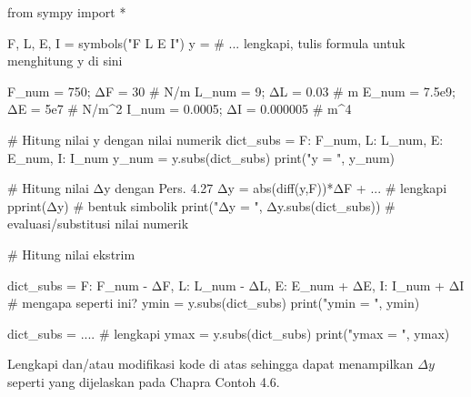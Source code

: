 \begin{pythoncode}
from sympy import *

F, L, E, I = symbols("F L E I")
y = # ... lengkapi, tulis formula untuk menghitung y di sini
    
F_num = 750; ΔF = 30 # N/m
L_num = 9; ΔL = 0.03 # m
E_num = 7.5e9; ΔE = 5e7 # N/m^2
I_num = 0.0005; ΔI = 0.000005 # m^4

# Hitung nilai y dengan nilai numerik
dict_subs = {F: F_num, L: L_num, E: E_num, I: I_num}
y_num = y.subs(dict_subs)
print("y = ", y_num)

# Hitung nilai Δy dengan Pers. 4.27
Δy = abs(diff(y,F))*ΔF + ... # lengkapi
pprint(Δy) # bentuk simbolik
print("Δy = ", Δy.subs(dict_subs)) # evaluasi/substitusi nilai numerik

# Hitung nilai ekstrim

dict_subs = {
  F: F_num - ΔF, L: L_num - ΔL,
  E: E_num + ΔE, I: I_num + ΔI  # mengapa seperti ini?
} 
ymin = y.subs(dict_subs)
print("ymin = ", ymin)
    
dict_subs = .... # lengkapi 
ymax = y.subs(dict_subs)
print("ymax = ", ymax)    
\end{pythoncode}

\begin{soal}
Lengkapi dan/atau modifikasi kode di atas sehingga dapat menampilkan $\Delta y$
seperti yang dijelaskan pada Chapra Contoh 4.6.
\end{soal}